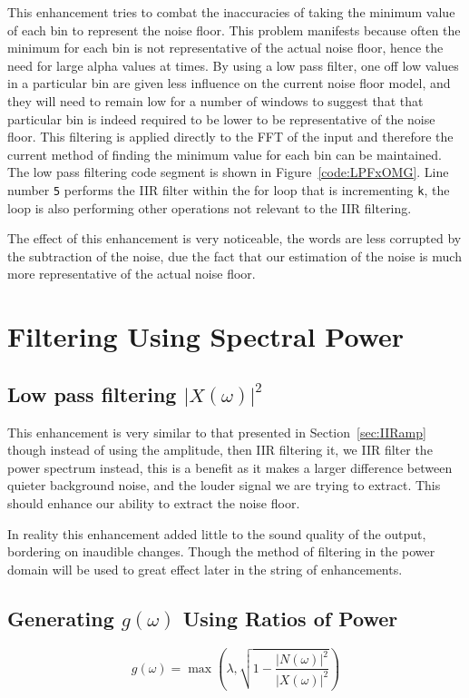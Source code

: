 \documentclass[11pt]{article} %
\begin{document}
{This enhancement tries to combat the inaccuracies of taking the minimum value of each bin to represent the noise floor. This problem manifests because often the minimum for each bin is not representative of the actual noise floor, hence the need for large alpha values at times. By using a low pass filter, one off low values in a particular bin are given less influence on the current noise floor model, and they will need to remain low for a number of windows to suggest that that particular bin is indeed required to be lower to be representative of the noise floor. This filtering is applied directly to the FFT of the input and therefore the current method of finding the minimum value for each bin can be maintained. The low pass filtering code segment is shown in Figure~\ref{code:LPFxOMG}. Line number \verb"5" performs the IIR filter within the for loop that is incrementing \verb"k", the loop is also performing other operations not relevant to the IIR filtering. 

The effect of this enhancement is very noticeable, the words are less corrupted by the subtraction of the noise, due the fact that our estimation of the noise is much more representative of the actual noise floor.   
\section{Filtering Using Spectral Power} 
\subsection{Low pass filtering $\lvert X(\omega) \rvert^{2} $} 

This enhancement is very similar to that presented in Section~\ref{sec:IIRamp} though instead of using the amplitude, then IIR filtering it, we IIR filter the power spectrum instead, this is a benefit as it makes a larger difference between quieter background noise, and the louder signal we are trying to extract. This should enhance our ability to extract the noise floor. 

In reality this enhancement added little to the sound quality of the output, bordering on inaudible changes. Though the method of filtering in the power domain will be used to great effect later in the string of enhancements.  

\subsection{Generating $g(\omega)$ Using Ratios of Power} 
\label{sec:powerrat}
\begin{equation}
\label{equ:powerRat}
	g(\omega) = \max\left(\lambda, \sqrt{1- \frac{\lvert N(\omega) \rvert ^{2}}{\lvert X(\omega) \rvert ^{2}}}\right)
\end{equation}

}
\end{document}
